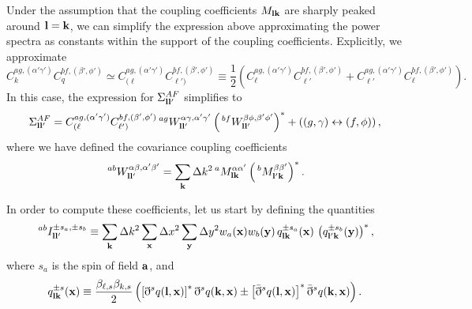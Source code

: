 \documentclass[a4paper,11pt]{article}
\newcommand{\summ}[1]{\sum_{\bf #1}\Delta #1^2}
\begin{document}
      Under the assumption that the coupling coefficients $M_{{\bf l}{\bf k}}$ are sharply peaked around ${\bf l}={\bf k}$, we can simplify the expression above approximating the power spectra as constants within the support of the coupling coefficients. Explicitly, we approximate 
      \begin{equation}\nonumber
        C^{ag,(\alpha'\gamma')}_kC^{bf,(\beta',\phi')}_q\simeq C^{ag,(\alpha'\gamma')}_{(\ell}C^{bf,(\beta',\phi')}_{\ell')}\equiv\frac{1}{2}\left(C^{ag,(\alpha'\gamma')}_\ell C^{bf,(\beta',\phi')}_{\ell'}+C^{ag,(\alpha'\gamma')}_{\ell'} C^{bf,(\beta',\phi')}_\ell\right).
      \end{equation}
      In this case, the expression for $\Sigma^{AF}_{{\bf l}{\bf l}'}$ simplifies to
      \begin{align}\label{eq:covar_efstathiou}
        \Sigma^{AF}_{{\bf l}{\bf l}'}=C^{ag,(\alpha'\gamma')}_{(\ell}C^{bf,(\beta',\phi')}_{\ell')}\,^{ag}W^{\alpha\gamma,\alpha'\gamma'}_{{\bf l}{\bf l}'}\left(\,^{bf}W^{\beta\phi,\beta'\phi'}_{{\bf l}{\bf l}'}\right)^*+\left((g,\gamma)\leftrightarrow(f,\phi)\right),
      \end{align}
      where we have defined the covariance coupling coefficients
      \begin{equation}\label{eq:covar_coupling}
        \,^{ab}W^{\alpha\beta,\alpha'\beta'}_{{\bf l}{\bf l}'}=\summ{k}\,^aM^{\alpha\alpha'}_{{\bf l}{\bf k}}\left(\,^bM^{\beta\beta'}_{{\bf l}'{\bf k}}\right)^*.
      \end{equation}

      In order to compute these coefficients, let us start by defining the quantities
      \begin{equation}
        \,^{ab}I^{\pm s_a,\pm s_b}_{{\bf l}{\bf l'}}\equiv\summ{k}\summ{x}\summ{y}w_a({\bf x})w_b({\bf y})\,q^{\pm s_a}_{{\bf l}{\bf k}}({\bf x})\,\left(q^{\pm s_b}_{{\bf l}'{\bf k}}({\bf y})\right)^*,
      \end{equation}
      where $s_a$ is the spin of field ${\bf a}$, and
      \begin{equation}
        q^{\pm s}_{{\bf l}{\bf k}}({\bf x})\equiv \frac{\beta_{\ell,s}\beta_{k,s}}{2}\left(\left[\eth^s q({\bf l},{\bf x})\right]^* \eth^sq({\bf k},{\bf x})\pm\left[\bar{\eth}^sq({\bf l},{\bf x})\right]^*\bar{\eth}^sq({\bf k},{\bf x})\right).
      \end{equation}
\end{document}
